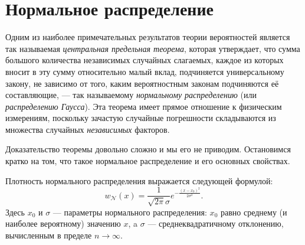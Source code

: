 

\section{Нормальное распределение}

Одним из наиболее примечательных результатов теории вероятностей является
так называемая \emph{центральная предельная теорема}, которая утверждает,
что сумма большого количества независимых случайных слагаемых, каждое
из которых вносит в эту сумму относительно малый вклад, подчиняется
универсальному закону, не зависимо от того, каким вероятностным законам
подчиняются её составляющие, --- так называемому \emph{нормальному
распределению} (или \emph{распределению Гаусса}). Эта теорема имеет
прямое отношение к физическим измерениям, поскольку зачастую случайные
погрешности складываются из множества случайных \emph{независимых}
факторов.

Доказательство теоремы довольно сложно и мы его не приводим. Остановимся
кратко на том, что такое нормальное распределение и его основных свойствах.

Плотность нормального распределения выражается следующей формулой:
\begin{equation}
    \label{eq:normal}
    \boxed{
        w_{\mathcal{N}}\!\left(x\right)=\frac{1}{\sqrt{2\pi}\sigma}e^{-\tfrac{(x-x_{0})^{2}}{2\sigma^{2}}}
    }.
\end{equation}
Здесь $x_{0}$ и $\sigma$
--- параметры нормального распределения: $x_{0}$ равно
среднему (и наиболее вероятному) значению $x$, a $\sigma$ ---
среднеквадратичному отклонению, вычисленным в пределе $n\to\infty$. 

